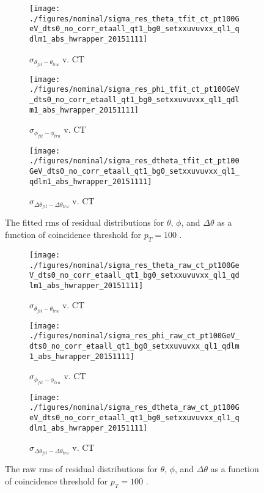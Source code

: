 \begin{figure}[!htbp]\captionsetup{justification=centering}\captionsetup{justification=centering}
  \begin{center}
  \begin{subfigure}{0.3\textwidth}\texttt{[image: ./figures/nominal/sigma\_res\_theta\_tfit\_ct\_pt100GeV\_dts0\_no\_corr\_etaall\_qt1\_bg0\_setxxuvuvxx\_ql1\_qdlm1\_abs\_hwrapper\_20151111]}\caption{$\sigma_{\theta_{fit}-\theta_{tru}}$ v. CT}\end{subfigure}
  \begin{subfigure}{0.3\textwidth}\texttt{[image: ./figures/nominal/sigma\_res\_phi\_tfit\_ct\_pt100GeV\_dts0\_no\_corr\_etaall\_qt1\_bg0\_setxxuvuvxx\_ql1\_qdlm1\_abs\_hwrapper\_20151111]}\caption{$\sigma_{\phi_{fit}-\phi_{tru}}$ v. CT}\end{subfigure}
  \begin{subfigure}{0.3\textwidth}\texttt{[image: ./figures/nominal/sigma\_res\_dtheta\_tfit\_ct\_pt100GeV\_dts0\_no\_corr\_etaall\_qt1\_bg0\_setxxuvuvxx\_ql1\_qdlm1\_abs\_hwrapper\_20151111]}\caption{$\sigma_{\Delta\theta_{fit}-\Delta\theta_{tru}}$ v. CT}\end{subfigure}
  \caption{\label{fig:nomresvCTfit} The fitted rms of residual distributions for $\theta$, $\phi$, and $\Delta\theta$ as a function of coincidence threshold for $p_T=100$ \GeV.}
  \end{center}
\end{figure}

\begin{figure}[!htbp]\captionsetup{justification=centering}\captionsetup{justification=centering}
  \begin{center}
  \begin{subfigure}{0.3\textwidth}\texttt{[image: ./figures/nominal/sigma\_res\_theta\_raw\_ct\_pt100GeV\_dts0\_no\_corr\_etaall\_qt1\_bg0\_setxxuvuvxx\_ql1\_qdlm1\_abs\_hwrapper\_20151111]}\caption{$\sigma_{\theta_{fit}-\theta_{tru}}$ v. CT}\end{subfigure}
  \begin{subfigure}{0.3\textwidth}\texttt{[image: ./figures/nominal/sigma\_res\_phi\_raw\_ct\_pt100GeV\_dts0\_no\_corr\_etaall\_qt1\_bg0\_setxxuvuvxx\_ql1\_qdlm1\_abs\_hwrapper\_20151111]}\caption{$\sigma_{\phi_{fit}-\phi_{tru}}$ v. CT}\end{subfigure}
  \begin{subfigure}{0.3\textwidth}\texttt{[image: ./figures/nominal/sigma\_res\_dtheta\_raw\_ct\_pt100GeV\_dts0\_no\_corr\_etaall\_qt1\_bg0\_setxxuvuvxx\_ql1\_qdlm1\_abs\_hwrapper\_20151111]}\caption{$\sigma_{\Delta\theta_{fit}-\Delta\theta_{tru}}$ v. CT}\end{subfigure}
  \caption{\label{fig:nomresvCTraw} The raw rms of residual distributions for $\theta$, $\phi$, and $\Delta\theta$ as a function of coincidence threshold for $p_T=100$ \GeV.}
  \end{center}
\end{figure}

